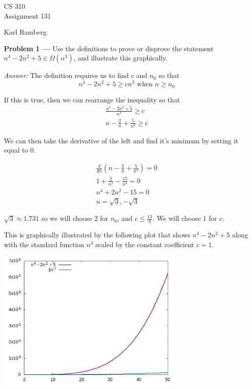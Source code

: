 \documentclass[11pt]{article}
\newcommand{\problem}[1]{\textbf{Problem #1 ---} }
\newcommand{\answer}{\textit{Answer: } }
\begin{document}
\thispagestyle{empty}

\begin{center}
{\large CS 310}\\
Assignment 131
\end{center}

\begin{flushright}
Karl Ramberg
\end{flushright}

\problem{1} Use the definitions to prove or disprove the statement
$n^4 - 2n^2 + 5 \in \Omega(n^3)$, and illustrate this graphically.

\answer The definition requires us to find $c$ and $n_0$ so that
\[
n^4 - 2n^2 + 5 \geq cn^3 \text{ when } n \geq n_0
\]

If this is true, then we can rearrange the inequality so that
\begin{align*}
\frac{n^4 - 2n^2 + 5}{n^3} \geq c \\
n - \frac{2}{n} + \frac{5}{n^3} \geq c
\end{align*}

We can then take the derivative of the left and find it's minimum by setting 
it equal to 0.

\begin{align*}
\frac{d}{dn}(n - \frac{2}{n} + \frac{5}{n^3}) = 0\\
1 + \frac{2}{n^2} - \frac{15}{n^4} = 0\\
n^4 + 2n^2 - 15 = 0\\
n = \sqrt{3}, -\sqrt{3}
\end{align*}

$\sqrt{3} \approx 1.731$ so we will choose $2$ for $n_0$, and $c \leq \frac{13}{8}$.
We will choose $1$ for $c$. 

This is graphically illustrated by the following plot that shows
$n^4 - 2n^2 + 5$ along with the standard function $n^3$ scaled by
the constant coefficient $c = 1$.

\begin{center}
  \includegraphics[width=0.7\textwidth]{problem1.png}
\end{center} 
\end{document}

